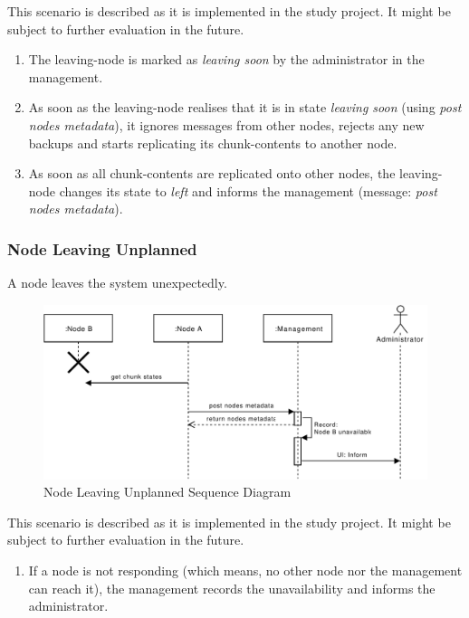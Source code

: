 This scenario is described as it is implemented in the study project. It might be subject to further evaluation in the future.

\begin{enumerate}
    \item The \gls{leaving-node} is marked as \emph{leaving soon} by the \gls{administrator} in the \gls{management}.
    \item As soon as the \gls{leaving-node} realises that it is in state \emph{leaving soon} (using \emph{post nodes metadata}), it ignores messages from other \glspl{node}, rejects any new backups and starts replicating its \glspl{chunk-content} to another \gls{node}.
    \item As soon as all \glspl{chunk-content} are replicated onto other \glspl{node}, the \gls{leaving-node} changes its state to \emph{left} and informs the \gls{management} (message: \emph{post nodes metadata}).
\end{enumerate}

\subsubsection{Node Leaving Unplanned}\label{sec:scenario-node-leave-unplanned}
A node leaves the system unexpectedly.

\begin{figure}[h]
    \centering
    \includegraphics[width=\linewidth]{resources/node_leaving_unplanned.pdf}
    \caption{Node Leaving Unplanned Sequence Diagram}
    \label{fig:node-leave-unplanned}
\end{figure}

This scenario is described as it is implemented in the study project. It might be subject to further evaluation in the future.

\begin{enumerate}
    \item If a \gls{node} is not responding (which means, no other \gls{node} nor the \gls{management} can reach it), the \gls{management} records the unavailability and informs the \gls{administrator}.
\end{enumerate}

